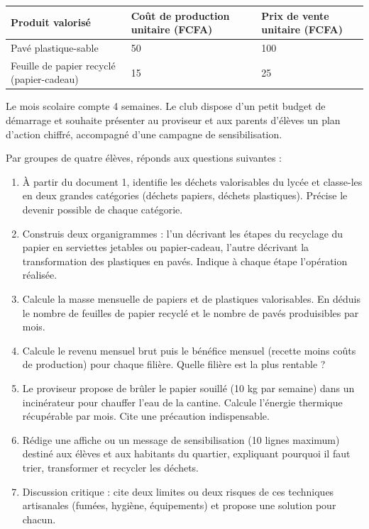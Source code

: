 \documentclass[11pt]{article}
\newcounter{popsec}
\newcounter{popsub}
\newcommand{\courssub}[1]{%
  \stepcounter{popsub}%
  \par\vspace{9pt}\noindent{\popxbold\fontsize{11.5}{13}\selectfont\color{popink}{\color{poporange}\thepopsec.\thepopsub}\hspace{6pt}#1}\par\nopagebreak\vspace{4pt}
}
\begin{document}
\begin{center}
\begin{tabularx}{\linewidth}{|l|X|X|}\hline
\rowcolor{popblueL} \textbf{Produit valorisé} & \textbf{Coût de production unitaire (FCFA)} & \textbf{Prix de vente unitaire (FCFA)} \\ \hline
Pavé plastique-sable & 50 & 100 \\ \hline
Feuille de papier recyclé (papier-cadeau) & 15 & 25 \\ \hline
\end{tabularx}
\end{center}

Le mois scolaire compte 4 semaines. Le club dispose d'un petit budget de démarrage et souhaite présenter au proviseur et aux parents d'élèves un plan d'action chiffré, accompagné d'une campagne de sensibilisation.

\courssub{Consignes}

Par groupes de quatre élèves, réponds aux questions suivantes :

\begin{enumerate}
\item À partir du document 1, identifie les déchets valorisables du lycée et classe-les en deux grandes catégories (déchets papiers, déchets plastiques). Précise le devenir possible de chaque catégorie.
\item Construis deux organigrammes : l'un décrivant les étapes du recyclage du papier en serviettes jetables ou papier-cadeau, l'autre décrivant la transformation des plastiques en pavés. Indique à chaque étape l'opération réalisée.
\item Calcule la masse mensuelle de papiers et de plastiques valorisables. En déduis le nombre de feuilles de papier recyclé et le nombre de pavés produisibles par mois.
\item Calcule le revenu mensuel brut puis le bénéfice mensuel (recette moins coûts de production) pour chaque filière. Quelle filière est la plus rentable ?
\item Le proviseur propose de brûler le papier souillé (10 kg par semaine) dans un incinérateur pour chauffer l'eau de la cantine. Calcule l'énergie thermique récupérable par mois. Cite une précaution indispensable.
\item Rédige une affiche ou un message de sensibilisation (10 lignes maximum) destiné aux élèves et aux habitants du quartier, expliquant pourquoi il faut trier, transformer et recycler les déchets.
\item Discussion critique : cite deux limites ou deux risques de ces techniques artisanales (fumées, hygiène, équipements) et propose une solution pour chacun.
\end{enumerate}
\end{document}
